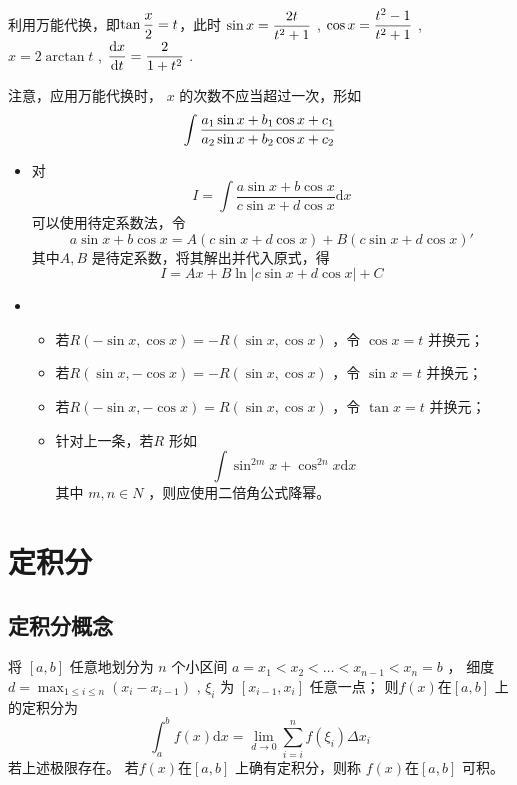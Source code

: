 \begin{Field}[三角有理函数的不定积分一般方法]

    利用万能代换，即$\tan \displaystyle\frac{x}{2} = t $，此时 $ \sin x = \displaystyle\frac{2t}{t^2+1} $ ,
    $ \cos x = \displaystyle\frac{t^2-1}{t^2+1} $ , $ x = 2\arctan t $ ,
    $ \displaystyle\frac{\mathrm{d}x}{\mathrm{d}t} = \displaystyle\frac{2}{1+t^2} $ .
\end{Field}

注意，应用万能代换时， $ x $ 的次数不应当超过一次，形如$$
    \int \displaystyle\frac{a_1\sin x + b_1 \cos x + c_1}{a_2\sin x + b_2 \cos x + c_2}
$$ 


\begin{itemize}
    \item 对 $$
        I = \int \frac{a\sin x + b\cos x}{c\sin x+d\cos x}\mathrm{d}x
    $$ 
    可以使用待定系数法，令$$
        a\sin x+b\cos x = A(c\sin x+d\cos x)+B(c\sin x+ d\cos x)'
    $$ 
    其中$ A,B $ 是待定系数，将其解出并代入原式，得$$
        I=Ax+B\ln|c\sin x+d\cos x|+C
    $$ 
    \item \begin{itemize}
        \item 若$ R(-\sin x, \cos x)=-R(\sin x, \cos x) $ ，令 $ \cos x = t $ 并换元；
        \item 若$ R(\sin x, -\cos x)=-R(\sin x, \cos x) $ ，令 $ \sin x = t $ 并换元；
        \item 若$ R(-\sin x, -\cos x)=R(\sin x, \cos x) $ ，令 $ \tan x = t $ 并换元；
        \item 针对上一条，若$ R $ 形如$$
            \int \sin^{2m} x + \cos^{2n} x \mathrm{d}x
        $$ 其中 $ m,n\in N $ ，则应使用二倍角公式降幂。
    \end{itemize}
\end{itemize}


\section{定积分}

\subsection{定积分概念}

\begin{Def}[]

    将 $ [a,b] $ 任意地划分为 $ n $ 个小区间 $ a = x_1<x_2<\dots<x_{n-1}<x_n=b $ ，
    细度 $ d=\max_{1\leq i \leq n}(x_i-x_{i-1}) $ , $ \xi_i $ 为 $ [x_{i-1},x_i] $ 任意一点；
    则$ f(x) $在$ [a,b] $ 上的定积分为$$
        \int_a^b f(x)\mathrm{d}x = {\displaystyle\lim_{d\rightarrow 0}}
        \sum_{i=i}^nf(\xi_i)\Delta x_i
    $$ 
    若上述极限存在。
    若$ f(x) $在$ [a,b] $ 上确有定积分，则称 $ f(x) $在$ [a,b] $ 可积。
\end{Def}

